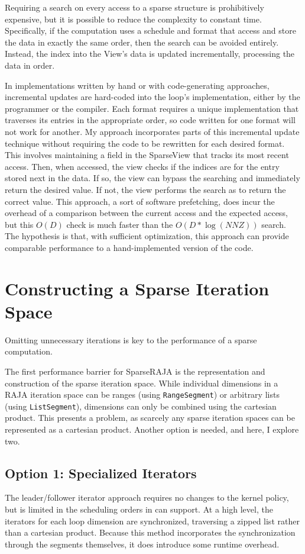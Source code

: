 Requiring a search on every access to a sparse structure is prohibitively expensive, but it is possible to reduce the complexity to constant time.
Specifically, if the computation uses a schedule and format that access and store the data in exactly the same order, then the search can be avoided entirely.
Instead, the index into the View's data is updated incrementally, processing the data in order.

In implementations written by hand or with code-generating approaches, incremental updates are hard-coded into the loop's implementation, either by the programmer or the compiler.
Each format requires a unique implementation that traverses its entries in the appropriate order, so code written for one format will not work for another.
My approach incorporates parts of this incremental update technique without requiring the code to be rewritten for each desired format. 
This involves maintaining a field in the SparseView that tracks its most recent access.
Then, when accessed, the view checks if the indices are for the entry stored next in the data. 
If so, the view can bypass the searching and immediately return the desired value. 
If not, the view performs the search as to return the correct value. 
This approach, a sort of software prefetching, does incur the overhead of a comparison between the current access and the expected access, but this $O(D)$ check is much faster than the $O(D*\log(NNZ))$ search.
The hypothesis is that, with sufficient optimization, this approach can provide comparable performance to a hand-implemented version of the code.

\section{Constructing a Sparse Iteration Space}\label{sec:sparseIterspace}
Omitting unnecessary iterations is key to the performance of a sparse computation. 


The first performance barrier for SparseRAJA is the representation and construction of the sparse iteration space.
While individual dimensions in a RAJA iteration space can be ranges (using \verb.RangeSegment.) or arbitrary lists (using \verb.ListSegment.), dimensions can only be combined using the cartesian product. 
This presents a problem, as scarcely any sparse iteration spaces can be represented as a cartesian product.
Another option is needed, and here, I explore two.


\subsection{Option 1: Specialized Iterators}
The leader/follower iterator approach requires no changes to the kernel policy, but is limited in the scheduling orders in can support. 
At a high level, the iterators for each loop dimension are synchronized, traversing a zipped list rather than a cartesian product. 
Because this method incorporates the synchronization through the segments themselves, it does introduce some runtime overhead.

